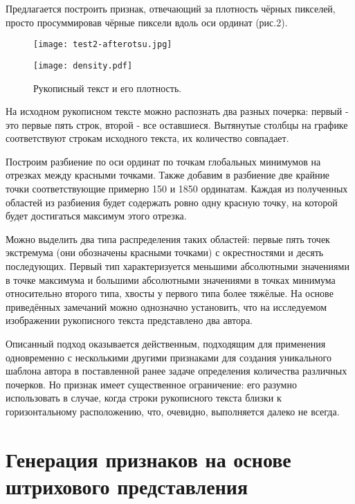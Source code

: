 \documentclass{article}
\begin{document}
Предлагается построить признак, отвечающий за плотность чёрных пикселей, просто просуммировав чёрные пиксели вдоль оси ординат (рис.2).

\begin{figure}[h]
\begin{minipage}[h]{0.48\linewidth}
    \centering
    \texttt{[image: test2-afterotsu.jpg]} 
\end{minipage}
\hfill
\begin{minipage}[h]{0.48\linewidth}
    \centering
    \texttt{[image: density.pdf]}
\end{minipage}
\caption{Рукописный текст и его плотность.}
\end{figure}

На исходном рукописном тексте можно распознать два разных почерка: первый - это первые пять строк, второй - все оставшиеся. Вытянутые столбцы на графике соответствуют строкам исходного текста, их количество совпадает. 

Построим разбиение по оси ординат по точкам глобальных минимумов на отрезках между красными точками. Также добавим в разбиение две крайние точки соответствующие примерно 150 и 1850 ординатам. Каждая из полученных областей из разбиения будет содержать ровно одну красную точку, на которой будет достигаться максимум этого отрезка.

Можно выделить два типа распределения таких областей: первые пять точек экстремума (они обозначены красными точками) с окрестностями и десять последующих. Первый тип характеризуется меньшими абсолютными значениями в точке максимума и большими абсолютными значениями в точках минимума относительно второго типа, хвосты у первого типа более тяжёлые. На основе приведённых замечаний можно однозначно установить, что на исследуемом изображении рукописного текста представлено два автора. 

Описанный подход оказывается действенным, подходящим для применения одновременно с несколькими другими признаками для создания уникального шаблона автора в поставленной ранее задаче определения количества различных почерков. Но признак имеет существенное ограничение: его разумно использовать в случае, когда строки рукописного текста близки к горизонтальному расположению, что, очевидно, выполняется далеко не всегда.

\section{Генерация признаков на основе штрихового представления}
\end{document}
